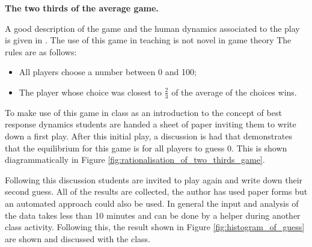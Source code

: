 \documentclass[12pt]{article}
\begin{document}
\begin{center}
    \textbf{The two thirds of the average game.}
\end{center}

A good description of the game and the human dynamics associated to the play is
given in \cite{Nagel1995}.  The use of this game in teaching is not novel in
game theory \cite{TheEconomicsNetwork2013}
The rules are as follows:

\begin{itemize}
    \item All players choose a number between 0 and 100;
    \item The player whose choice was closest to \(\frac{2}{3}\) of the average
        of the choices wins.
\end{itemize}

To make use of this game in class as an introduction to the concept of best
response dynamics students are handed a sheet of paper inviting them to write
down a first play. After this initial play, a discussion is had that
demonstrates that the equilibrium for this game is for all players to guess 0.
This is shown diagrammatically in Figure
\ref{fig:rationalisation_of_two_thirds_game}.

Following this discussion students are invited to play again and write down
their second guess. All of the results are collected, the author has used paper
forms but an automated approach could also be used. In general the input and
analysis of the data takes less than 10 minutes and can be done by a helper
during another class activity.
Following this, the result shown in Figure \ref{fig:histogram_of_guess} are
shown and discussed with the class.
\end{document}
